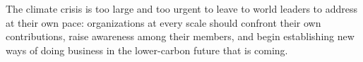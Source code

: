 \documentclass[12pt]{article}
\newcommand{\bcp}[1]{\ifdraft{\bf [bcp: #1]}\fi}
\begin{document}
The climate crisis is too large and too urgent to leave to world leaders to
address at their own pace: organizations at every scale should confront
their own contributions, raise awareness among their members, and begin
establishing new ways of doing business in the lower-carbon future that is
coming.
\end{document}
